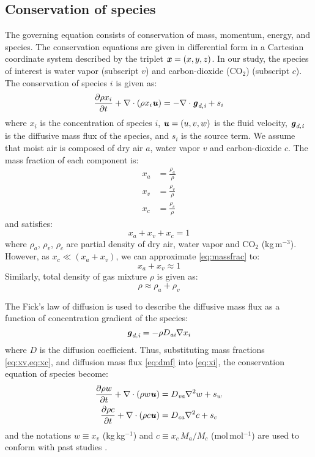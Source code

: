 \subsection*{Conservation of species}
The governing equation consists of conservation of mass, momentum, energy, and species. The conservation equations are given in differential form in a Cartesian coordinate system described by the triplet $\textbf{\textit{x}} = (x,y,z)$. In our study, the species of interest is water vapor (subscript $v$) and carbon-dioxide (CO$_2$) (subscript $c$). The conservation of species $i$ is given as:
\begin{equation}
\frac{\partial \rho x_i}{\partial t} + \nabla  \cdot \left( \rho x_i \textbf{\textit{u}} \right) = - \nabla \cdot \textbf{\textit{g}}_{\textit{d,i}} + s_i
\label{eq:xi}
\end{equation}
where $x_i$ is the concentration of species $i$, $\textbf{\textit{u}} = \left(u,v,w\right)$ is the fluid velocity, $\textbf{\textit{g}}_{\textit{d,i}}$ is the diffusive mass flux of the species, and $s_i$ is the source term. We assume that moist air is composed of dry air $a$, water vapor $v$ and carbon-dioxide $c$. The mass fraction of each component is:
\begin{align}
x_a &= \frac{\rho_a}{\rho} \\
x_v &= \frac{\rho_v}{\rho} \label{eq:xv}\\
x_c &= \frac{\rho_c}{\rho}\label{eq:xc}
\end{align}
and satisfies:
\begin{equation}
x_a + x_v + x_c = 1
\label{eq:massfrac}
\end{equation}
where $\rho_a$, $\rho_v$, $\rho_c$ are partial density of dry air, water vapor and CO$_2$ (kg\,m$^{-3}$). However, as $x_c \ll (x_a+x_v)$, we can approximate \cref{eq:massfrac} to:
\begin{equation}
x_a + x_v \approx 1
\end{equation}
Similarly, total density of gas mixture $\rho$ is given as:
\begin{equation}
\rho \approx \rho_a + \rho_v
\label{eq:rho2}
\end{equation} 

The Fick's law of diffusion is used to describe the diffusive mass flux as a function of concentration gradient of the species:
\begin{equation}
\textbf{\textit{g}}_{\textit{d,i}} = - \rho D_{\textit{ai}} \nabla x_i
\label{eq:dmf}
\end{equation}
where $D$ is the diffusion coefficient. Thus, substituting mass fractions \cref{eq:xv,eq:xc}, and diffusion mass flux \cref{eq:dmf} into \cref{eq:xi}, the conservation equation of species become:
\begin{align}
\frac{\partial \rho w}{\partial t} + \nabla  \cdot \left( \rho w \textbf{\textit{u}} \right) &= D_{\textit{va}} \nabla^2 w + s_w \label{eq:xv2}\\
\frac{\partial \rho c}{\partial t} + \nabla  \cdot \left( \rho c \textbf{\textit{u}} \right) &= D_{\textit{ca}} \nabla^2 c + s_c \label{eq:xc2}
\end{align}
and the notations $w\equiv x_v$ (kg\,kg$^{-1}$) and $c\equiv x_c\, M_a/M_c $ (mol\,mol$^{-1}$) are used to conform with past studies \citep{Carmeliet2005, Defraeye2011, Saneinejad2013, Kubilay2014b}.

